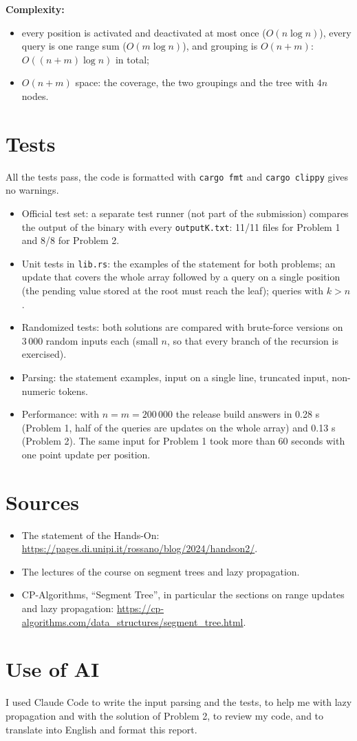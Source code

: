 \documentclass[11pt,a4paper]{article}
\begin{document}
\textbf{Complexity:}
\begin{itemize}
\item every position is activated and deactivated at most once ($O(n\log n)$), every query is one range sum
($O(m \log n)$), and grouping is $O(n+m)$: $O((n+m)\log n)$ in total;
\item $O(n+m)$ space: the coverage, the two groupings and the tree with $4n$ nodes.
\end{itemize}

\section*{Tests}

All the tests pass, the code is formatted with \texttt{cargo fmt} and \texttt{cargo clippy} gives no warnings.
\begin{itemize}
\item Official test set: a separate test runner (not part of the submission) compares the output of the binary with every
\texttt{outputK.txt}: 11/11 files for Problem 1 and 8/8 for Problem 2.
\item Unit tests in \texttt{lib.rs}: the examples of the statement for both problems; an update that covers
the whole array followed by a query on a single position (the pending value stored at the root must reach the
leaf); queries with $k > n$.
\item Randomized tests: both solutions are compared with brute-force versions on 3\,000 random inputs each
(small $n$, so that every branch of the recursion is exercised).
\item Parsing: the statement examples, input on a single line, truncated input, non-numeric tokens.
\item Performance: with $n = m = 200\,000$ the release build answers in 0.28 s (Problem 1, half of the
queries are updates on the whole array) and 0.13 s (Problem 2). The same input for Problem 1 took more than
60 seconds with one point update per position.
\end{itemize}

\section*{Sources}
\begin{itemize}
\item The statement of the Hands-On: \url{https://pages.di.unipi.it/rossano/blog/2024/handson2/}.
\item The lectures of the course on segment trees and lazy propagation.
\item CP-Algorithms, ``Segment Tree'', in particular the sections on range updates and lazy propagation:
\url{https://cp-algorithms.com/data_structures/segment_tree.html}.
\end{itemize}

\section*{Use of AI}
I used Claude Code to write the input parsing and the tests, to help me with lazy propagation and with the
solution of Problem 2, to review my code, and to translate into English and format this report.
\end{document}
